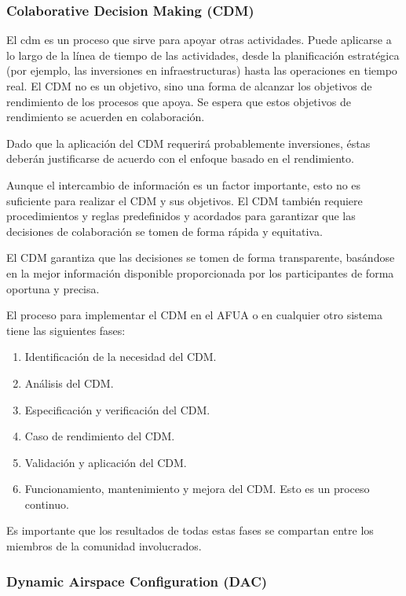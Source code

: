 \subsubsection{Colaborative Decision Making (CDM)}

El \acrfull{cdm} es un proceso que sirve para apoyar otras actividades. Puede aplicarse a lo largo de la línea de tiempo de las actividades, desde la planificación estratégica (por ejemplo, las inversiones en infraestructuras) hasta las operaciones en tiempo real. El CDM no es un objetivo, sino una forma de alcanzar los objetivos de rendimiento de los procesos que apoya. Se espera que estos objetivos de rendimiento se acuerden en colaboración. 

Dado que la aplicación del CDM requerirá probablemente inversiones, éstas deberán justificarse de acuerdo con el enfoque basado en el rendimiento.

Aunque el intercambio de información es un factor importante, esto no es suficiente para realizar el CDM y sus objetivos. El CDM también requiere procedimientos y reglas predefinidos y acordados para garantizar que las decisiones de colaboración se tomen de forma rápida y equitativa.

El CDM garantiza que las decisiones se tomen de forma transparente, basándose en la mejor información disponible proporcionada por los participantes de forma oportuna y precisa.

El proceso para implementar el CDM en el AFUA o en cualquier otro sistema tiene las siguientes fases:

\begin{enumerate}
    \item Identificación de la necesidad del CDM.
    \item Análisis del CDM.
    \item Especificación y verificación del CDM.
    \item Caso de rendimiento del CDM.
    \item Validación y aplicación del CDM.
    \item Funcionamiento, mantenimiento y mejora del CDM. Esto es un proceso continuo.
\end{enumerate}

Es importante que los resultados de todas estas fases se compartan entre los miembros de la comunidad involucrados.

\subsubsection{Dynamic Airspace Configuration (DAC)}

